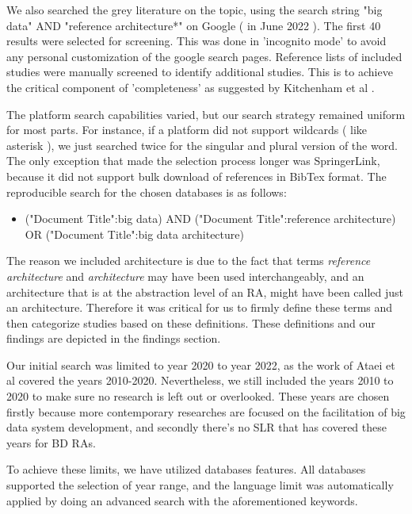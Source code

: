 \documentclass{ieeeaccess}
\begin{document}
We also searched the grey literature on the topic, using the search string "big data" AND "reference architecture*" on Google ( in June 2022 ). The first 40 results were selected for screening. This was done in 'incognito mode' to avoid any personal customization of the google search pages. Reference lists of included studies were manually screened to identify additional studies. This is to achieve the critical component of 'completeness' as suggested by Kitchenham et al \cite{kitchenham2015evidence}.

The platform search capabilities varied, but our search strategy remained uniform for most parts. For instance, if a platform did not support wildcards ( like asterisk ), we just searched twice for the singular and plural version of the word. The only exception that made the selection process longer was SpringerLink, because it did not support bulk download of references in BibTex format. The reproducible search for the chosen databases is as follows: 

\begin{itemize}
    \item ("Document Title":big data) AND ("Document Title":reference architecture) OR ("Document Title":big data architecture)
\end{itemize}

The reason we included architecture is due to the fact that terms \emph{reference architecture} and \emph{architecture} may have been used interchangeably, and an architecture that is at the abstraction level of an RA, might have been called just an architecture. Therefore it was critical for us to firmly define these terms and then categorize studies based on these definitions. These definitions and our findings are depicted in the findings section.

Our initial search was limited to year 2020 to year 2022, as the work of Ataei et al \cite{AtaeiACIS} covered the years 2010-2020. Nevertheless, we still included the years 2010 to 2020 to make sure no research is left out or overlooked. These years are chosen firstly because more contemporary researches are focused on the facilitation of big data system development, and secondly there's no SLR that has covered these years for BD RAs.

To achieve these limits, we have utilized databases features. All databases supported the selection of year range, and the language limit was automatically applied by doing an advanced search with the aforementioned keywords.
\end{document}
